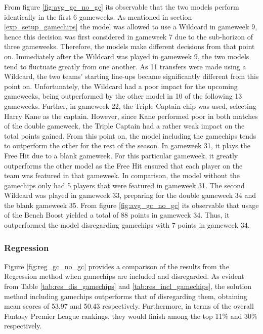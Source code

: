 From figure \ref{fig:avg_gc_no_gc} its observable that the two models perform identically in the first 6 gameweeks. As mentioned in section \ref{exp_setup_gamechips} the model was allowed to use a Wildcard in gameweek 9, hence this decision was first considered in gameweek 7 due to the sub-horizon of three gameweeks. Therefore, the models make different decisions from that point on. Immediately after the Wildcard was played in gameweek 9, the two models tend to fluctuate greatly from one another. As 11 transfers were made using a Wildcard, the two teams' starting line-ups became significantly different from this point on. Unfortunately, the Wildcard had a poor impact for the upcoming gameweeks, being outperformed by the other model in 10 of the following 13 gameweeks. Further, in gameweek 22, the Triple Captain chip was used, selecting Harry Kane as the captain. However, since Kane performed poor in both matches of the double gameweek, the Triple Captain had a rather weak impact on the total points gained. From this point on, the model including the gamechips tends to outperform the other for the rest of the season. In gameweek 31, it plays the Free Hit due to a blank gameweek. For this particular gameweek, it greatly outperforms the other model as the Free Hit ensured that each player on the team was featured in that gameweek. In comparison, the model without the gamechips only had 5 players that were featured in gameweek 31. The second Wildcard was played in gameweek 33, preparing for the double gameweek 34 and the blank gameweek 35. From figure \ref{fig:avg_gc_no_gc} its observable that usage of the Bench Boost yielded a total of 88 points in gameweek 34. Thus, it outperformed the model disregarding  gamechips with 7 points in gameweek 34. 



\subsubsection{Regression}
Figure \ref{fig:reg_gc_no_gc} provides a comparison of the results from the Regression method when gamechips are included and disregarded. As evident from Table \ref{tab:res_dis_gamechips} and \ref{tab:res_incl_gamechips}, the solution method including gamechips outperforms that of disregarding them, obtaining mean scores of 53.97 and 50.43 respectively. Furthermore, in terms of the overall Fantasy Premier League rankings, they would finish among the top 11\% and 30\% respectively. 


